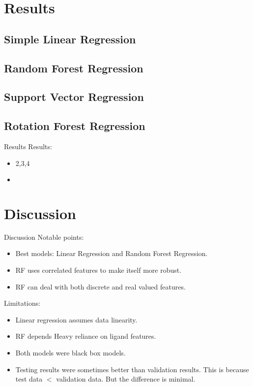 \documentclass{beamer}
\begin{document}
\section{Results}
\subsection{Simple Linear Regression}
\subsection{Random Forest Regression}
\subsection{Support Vector Regression}
\subsection{Rotation Forest Regression}


\begin{frame}[t]{Results}
Results:
\begin{itemize}
\item 2,3,4
\item
\end{itemize} 
\end{frame}

\section{Discussion}
\begin{frame}[t]{Discussion}
Notable points:
\begin{itemize}
\item Best models: Linear Regression and Random Forest Regression.
\item RF uses correlated features to make itself more robust.
\item RF can deal with both discrete and real valued features.
\end{itemize} 
Limitations:
\begin{itemize}
\item Linear regression assumes data linearity.
\item RF depends Heavy reliance on ligand features.
\item Both models were black box models.
\item Testing results were sometimes better than validation results. This is because test data $<$ validation data.
But the difference is minimal.
\end{itemize} 
\end{frame}
\end{document}
